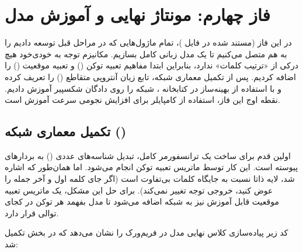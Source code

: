 \documentclass{article}
\begin{document}
\section{فاز چهارم: مونتاژ نهایی و آموزش مدل }

\begin{tcolorbox}[
	colback=softgreen,
	colframe=mygreen,
	title=هدف فاز چهارم پروژه (\lr{Assembling and Training}),
	attach boxed title to top right={yshift=-2mm, xshift=-5mm},
	boxed title style={colback=mygreen, rounded corners}
	]
	در این فاز (مستند شده در فایل )، تمام ماژول‌هایی که در مراحل قبل توسعه دادیم را به هم متصل می‌کنیم تا یک مدل زبانی کامل بسازیم. مکانیزم توجه به خودی‌خود هیچ درکی از «ترتیب کلمات» ندارد، بنابراین ابتدا مفاهیم تعبیه توکن () و تعبیه موقعیت () را اضافه کردیم. پس از تکمیل معماری شبکه، تابع زیان آنتروپی متقاطع () را تعریف کرده و با استفاده از بهینه‌ساز  در کتابخانه ، شبکه را روی دادگان شکسپیر آموزش دادیم. نقطه اوج این فاز، استفاده از کامپایلر  برای افزایش نجومی سرعت آموزش است.
\end{tcolorbox}

\subsection{تکمیل معماری شبکه ()}
اولین قدم برای ساخت یک ترانسفورمر کامل، تبدیل شناسه‌های عددی () به بردارهای پیوسته است. این کار توسط ماتریس تعبیه توکن انجام می‌شود. اما همان‌طور که اشاره شد، لایه  ذاتا نسبت به جایگاه کلمات بی‌تفاوت است (اگر جای کلمه اول و آخر جمله را عوض کنید، خروجی توجه تغییر نمی‌کند). برای حل این مشکل، یک ماتریس تعبیه موقعیت قابل آموزش نیز به شبکه اضافه می‌شود تا مدل بفهمد هر توکن در کجای توالی قرار دارد.

کد زیر پیاده‌سازی کلاس نهایی مدل در فریم‌ورک  را نشان می‌دهد که در بخش  تکمیل شد:
\end{document}
